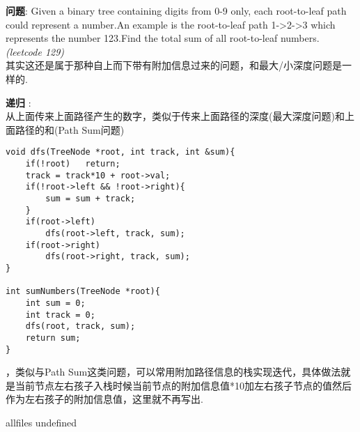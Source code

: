 \documentclass{article}
\begin{document}
\begin{CJK}{UTF8}{gbsn}     %

\else
	
\begin{description}
	\item{\textbf{问题}}: Given a binary tree containing digits from 0-9 only, each root-to-leaf path could represent a number.An example is the root-to-leaf path 1->2->3 which represents the number 123.Find the total sum of all root-to-leaf numbers. \textit{(leetcode 129)}
	\\其实这还是属于那种自上而下带有附加信息过来的问题，和最大/小深度问题是一样的.
	\item{\textbf{递归}} : 
	\\从上面传来上面路径产生的数字，类似于传来上面路径的深度(最大深度问题)和上面路径的和(Path Sum问题)
	\begin{lstlisting}
void dfs(TreeNode *root, int track, int &sum){
	if(!root)	return;
	track = track*10 + root->val;
	if(!root->left && !root->right){
		sum = sum + track;
	}
	if(root->left)
		dfs(root->left, track, sum);
	if(root->right)
		dfs(root->right, track, sum);
}

int sumNumbers(TreeNode *root){
	int sum = 0;
	int track = 0;
	dfs(root, track, sum);
	return sum;
}
	\end{lstlisting}
	，类似与Path Sum这类问题，可以常用附加路径信息的栈实现迭代，具体做法就是当前节点左右孩子入栈时候当前节点的附加信息值*10加左右孩子节点的值然后作为左右孩子的附加信息值，这里就不再写出.
\end{description}

\fi

\ifx allfiles undefined
\end{CJK}
\end{document}
